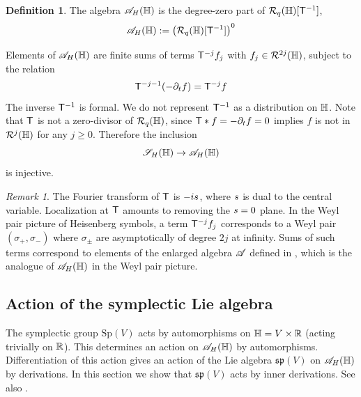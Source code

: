 \documentclass[11pt]{amsart}
\theoremstyle{plain}
\theoremstyle{definition}
\newtheorem{definition}[theorem]{Definition}
\theoremstyle{remark}
\newtheorem{remark}[theorem]{Remark}
\begin{document}
\begin{definition}\label{eq:degree-zero-localized-algebra}
The algebra ${\mathscr{A}}_H(\mathbb{H})$ is the degree-zero part of $\mathcal{R}_q(\mathbb{H})[\mathsf{T}^{-1}]$,
\begin{equation*}
 {\mathscr{A}}_H(\mathbb{H})
   :=\left(\mathcal{R}_q(\mathbb{H})[\mathsf{T}^{-1}]\right)^0
\end{equation*}
\end{definition}
Elements of ${\mathscr{A}}_H(\mathbb{H})$ are finite sums of terms $\mathsf{T}^{-j}f_j$ with
$f_j\in\mathcal{R}^{2j}(\mathbb{H})$, subject to the relation
\[ \mathsf{T}^{-j-1}(-\partial_tf)=\mathsf{T}^{-j}f\]
The inverse $\mathsf{T}^{-1}$ is formal.
We do not represent $\mathsf{T}^{-1}$ as a distribution on $\mathbb{H}$.
Note that $\mathsf{T}$ is not a zero-divisor of $\mathcal{R}_q(\mathbb{H})$, since $\mathsf{T} * f=-\partial_t f=0$ implies $f$ is not in $\mathcal{R}^j(\mathbb{H})$ for any $j\ge 0$. Therefore the inclusion
\[{\mathscr{S}_H}(\mathbb{H})\to {\mathscr{A}}_H(\mathbb{H})\]
is injective.

\begin{remark}
The Fourier transform of $\mathsf{T}$ is $-is$, where $s$ is dual to the central variable. Localization at $\mathsf{T}$ amounts to removing the $s=0$ plane.
In the Weyl pair picture of Heisenberg symbols, a term $\mathsf{T}^{-j}f_j$ corresponds to a Weyl pair $(\sigma_+,\sigma_-)$ where $\sigma_\pm$ are asymptotically of degree $2j$ at infinity. Sums of such terms correspond to elements of the enlarged algebra ${\mathscr{A}}$ defined in \cite[Section 3.3]{GvE20}, which is the analogue of ${\mathscr{A}}_H(\mathbb{H})$ in the Weyl pair picture.
\end{remark}

\subsection{Action of the symplectic Lie algebra}

The symplectic group $\mathrm{Sp}(V)$ acts by automorphisms on $\mathbb{H}=V\times {\mathbb{R}}$ (acting trivially on ${\mathbb{R}}$).
This determines an action on ${\mathscr{A}}_H(\mathbb{H})$ by automorphisms.
Differentiation of this action gives an action of the Lie algebra $\mathfrak{sp}(V)$ on ${\mathscr{A}}_H(\mathbb{H})$ by derivations.
In this section we show that $\mathfrak{sp}(V)$ acts by inner derivations.
See also \cite[Section 4]{GvE20}.
\end{document}

